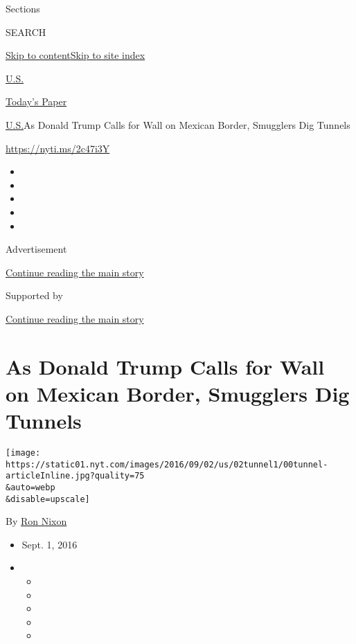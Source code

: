 Sections

SEARCH

\protect\hyperlink{site-content}{Skip to
content}\protect\hyperlink{site-index}{Skip to site index}

\href{https://www.nytimes.com/section/us}{U.S.}

\href{https://myaccount.nytimes.com/auth/login?response_type=cookie\&client_id=vi}{}

\href{https://www.nytimes.com/section/todayspaper}{Today's Paper}

\href{/section/us}{U.S.}\textbar{}As Donald Trump Calls for Wall on
Mexican Border, Smugglers Dig Tunnels

\url{https://nyti.ms/2c47i3Y}

\begin{itemize}
\item
\item
\item
\item
\item
\end{itemize}

Advertisement

\protect\hyperlink{after-top}{Continue reading the main story}

Supported by

\protect\hyperlink{after-sponsor}{Continue reading the main story}

\hypertarget{as-donald-trump-calls-for-wall-on-mexican-border-smugglers-dig-tunnels}{%
\section{As Donald Trump Calls for Wall on Mexican Border, Smugglers Dig
Tunnels}\label{as-donald-trump-calls-for-wall-on-mexican-border-smugglers-dig-tunnels}}

\texttt{[image: https://static01.nyt.com/images/2016/09/02/us/02tunnel1/00tunnel-articleInline.jpg?quality=75\\\&auto=webp\\\&disable=upscale]}

By \href{http://www.nytimes.com/by/ron-nixon}{Ron Nixon}

\begin{itemize}
\item
  Sept. 1, 2016
\item
  \begin{itemize}
  \item
  \item
  \item
  \item
  \item
  \end{itemize}
\end{itemize}

